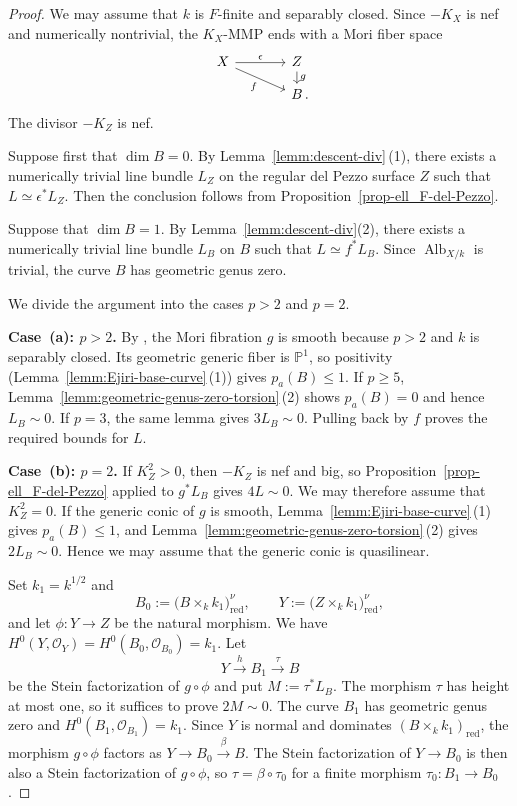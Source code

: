 \documentclass[10pt,abstract=true]{scrartcl}
\numberwithin{equation}{section}
\theoremstyle{definition}
\theoremstyle{remark}
\DeclareMathOperator\Alb{Alb}
\begin{document}
\begin{proof}
  We may assume that $k$ is $F$-finite and separably closed.
  Since $-K_X$ is nef and numerically nontrivial, the $K_X$-MMP ends with a Mori fiber space
  \[
    \begin{tikzcd}[column sep=large,row sep=small]
      X \ar[r,"\epsilon"] \ar[dr,"f"'] & Z \ar[d,"g"] \\
        & B\rlap{\,.}
    \end{tikzcd}
  \]
  The divisor $-K_Z$ is nef.

  Suppose first that $\dim B = 0$.
  By Lemma~\ref{lemm:descent-div}\,\textup{(1)}, there exists a numerically trivial line bundle $L_Z$ on the regular del Pezzo surface $Z$ such that $L \simeq \epsilon^*L_Z$.
  Then the conclusion follows from Proposition~\ref{prop-ell_F-del-Pezzo}.

  Suppose that $\dim B = 1$.
  By Lemma~\ref{lemm:descent-div}\textup{(2)}, there exists a numerically trivial line bundle $L_B$ on $B$ such that $L \simeq f^*L_B$.
  Since $\Alb_{X/k}$ is trivial, the curve $B$ has geometric genus zero.

  We divide the argument into the cases $p>2$ and $p=2$.

  \par\smallskip
  \noindent\textbf{Case~\textup{(a)}: $p>2$.}
  By \cite[Proposition~2.18]{Bernasconi-Tanaka-22}, the Mori fibration $g$ is smooth because $p>2$ and $k$ is separably closed.
  Its geometric generic fiber is $\mathbb P^1$, so positivity (Lemma~\ref{lemm:Ejiri-base-curve}\,\textup{(1)}) gives $p_a(B)\leq1$.
  If $p\geq5$, Lemma~\ref{lemm:geometric-genus-zero-torsion}\,\textup{(2)} shows $p_a(B)=0$ and hence $L_B\sim0$.
  If $p=3$, the same lemma gives $3L_B\sim0$.
  Pulling back by $f$ proves the required bounds for $L$.

  \par\smallskip
  \noindent\textbf{Case~\textup{(b)}: $p=2$.}
  If $K_Z^2>0$, then $-K_Z$ is nef and big, so Proposition~\ref{prop-ell_F-del-Pezzo} applied to $g^*L_B$ gives $4L\sim0$.
  We may therefore assume that $K_Z^2=0$.
  If the generic conic of $g$ is smooth, Lemma~\ref{lemm:Ejiri-base-curve}\,\textup{(1)} gives $p_a(B)\le1$, and Lemma~\ref{lemm:geometric-genus-zero-torsion}\,\textup{(2)} gives $2L_B\sim0$.
  Hence we may assume that the generic conic is quasilinear.

  Set $k_1=k^{1/2}$ and
  \[
    B_0:=\bigl(B\times_k k_1\bigr)_{\mathrm{red}}^\nu,
    \qquad
    Y:=\bigl(Z\times_k k_1\bigr)_{\mathrm{red}}^\nu,
  \]
  and let $\phi\colon Y\to Z$ be the natural morphism.
  We have $H^0(Y,\mathcal O_Y)=H^0(B_0,\mathcal O_{B_0})=k_1$.
  Let
  \[
    Y\xrightarrow{h}B_1\xrightarrow{\tau}B
  \]
  be the Stein factorization of $g\circ\phi$ and put $M:=\tau^*L_B$.
  The morphism $\tau$ has height at most one, so it suffices to prove $2M\sim0$.
  The curve $B_1$ has geometric genus zero and $H^0(B_1,\mathcal O_{B_1}) = k_1$.
  Since $Y$ is normal and dominates $(B\times_k k_1)_{\mathrm{red}}$, the morphism $g\circ\phi$ factors as $Y\to B_0\xrightarrow{\beta}B$.
  The Stein factorization of $Y\to B_0$ is then also a Stein factorization of $g\circ\phi$, so $\tau=\beta\circ\tau_0$ for a finite morphism $\tau_0\colon B_1\to B_0$.


\end{proof}
\end{document}
